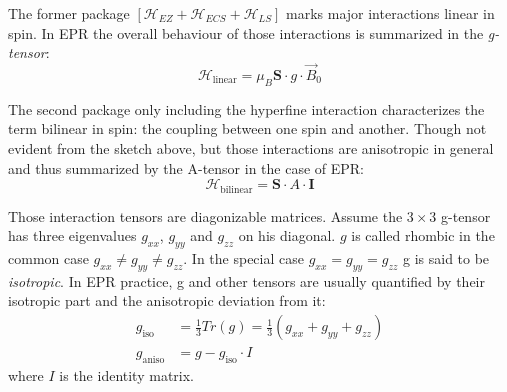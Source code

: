 \documentclass[11.5pt,a4paper]{article}
\begin{document}
  The former package $\left[\mathcal{H}_{EZ} + \mathcal{H}_{ECS} + \mathcal{H}_{LS}\right]$ marks major interactions linear in spin. In EPR the overall behaviour of those interactions is summarized in the \emph{g-tensor}:
  \begin{equation}
    \mathcal{H}_\text{linear} = \mu_B \mathbf{S} \cdot g \cdot \vec{B}_0
  \end{equation}

  The second package only including the hyperfine interaction characterizes the term bilinear in spin: the coupling between one spin and another. Though not evident from the sketch above, but those interactions are anisotropic in general and thus summarized by the A-tensor in the case of EPR:
  \begin{equation}
    \mathcal{H}_\text{bilinear} = \mathbf{S} \cdot A \cdot \mathbf{I}
  \end{equation}

  Those interaction tensors are diagonizable matrices. Assume the $3 \times 3$ g-tensor has three eigenvalues $g_{xx}$, $g_{yy}$ and $g_{zz}$ on his diagonal. $g$ is called rhombic in the common case $g_{xx} \neq g_{yy} \neq g_{zz}$. In the special case $g_{xx} = g_{yy} = g_{zz}$ g is said to be \emph{isotropic}. In EPR practice, g and other tensors are usually quantified by their isotropic part and the anisotropic deviation from it:
\begin{align}
 g_\text{iso} & = \frac{1}{3} Tr(g) = \frac{1}{3} (g_{xx} + g_{yy} + g_{zz})\\
 g_\text{aniso} & = g - g_\text{iso} \cdot I
\end{align}
where $I$ is the identity matrix.
\end{document}
